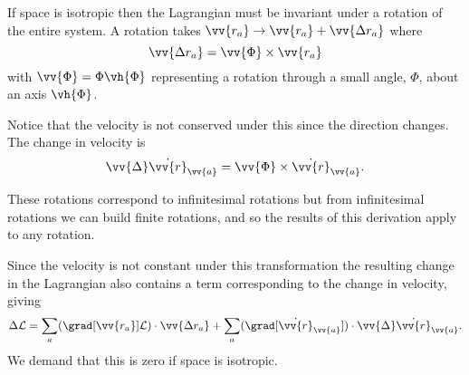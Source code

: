 \documentclass[fleqn]{NotesClass}
\newcommand*{\lagrangian}{\mathcal{L}}
\begin{document}
    If space is isotropic then the Lagrangian must be invariant under a rotation of the entire system.
    A rotation takes \(\vv{r_a} \to \vv{r_a} + \vv{\Delta r_a}\) where
    \begin{equation}
        \vv{\Delta r_a} = \vv{\Phi} \times \vv{r_a}
    \end{equation}
    with \(\vv{\Phi} = \Phi\vh{\Phi}\) representing a rotation through a small angle, \(\Phi\), about an axis \(\vh{\Phi}\).
    
    Notice that the velocity is not conserved under this since the direction changes.
    The change in velocity is
    \begin{equation}
        \vv{\Delta}\dot{\vv{r}}_{\vv{a}} = \vv{\Phi} \times \dot{\vv{r}}_{\vv{a}}.
    \end{equation}

    These rotations correspond to infinitesimal rotations but from infinitesimal rotations we can build finite rotations, and so the results of this derivation apply to any rotation.
    
    Since the velocity is not constant under this transformation the resulting change in the Lagrangian also contains a term corresponding to the change in velocity, giving
    \begin{equation}
        \Delta\lagrangian = \sum_a (\grad[\vv{r_a}]\lagrangian) \cdot \vv{\Delta r_a} + \sum_a (\grad[\dot{\vv{r}}_{\vv{a}}]) \cdot \vv{\Delta}\dot{\vv{r}}_{\vv{a}}.
    \end{equation}
    We demand that this is zero if space is isotropic.
    
\end{document}
